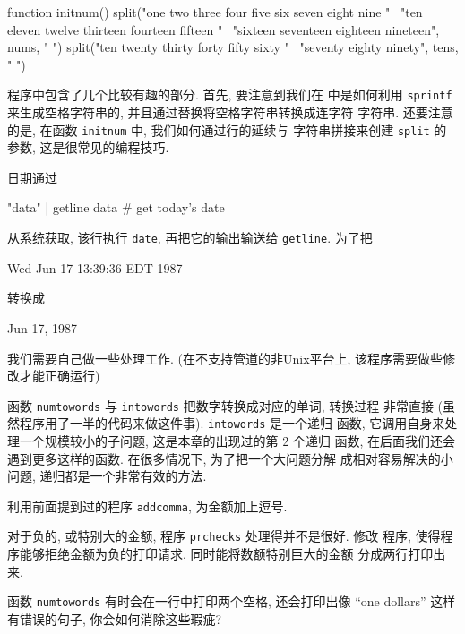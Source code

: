\begin{shell}
\begin{awkcode}
    function initnum() {
        split("one two three four five six seven eight nine " \
              "ten eleven twelve thirteen fourteen fifteen " \
              "sixteen seventeen eighteen nineteen", nums, " ")
        split("ten twenty thirty forty fifty sixty " \
              "seventy eighty ninety", tens, " ")
    }
\end{awkcode}

程序中包含了几个比较有趣的部分. 首先, 要注意到我们在 \BEGIN 中是如何利用
\verb'sprintf' 来生成空格字符串的, 并且通过替换将空格字符串转换成连字符
字符串. 还要注意的是, 在函数 \verb'initnum' 中, 我们如何通过行的延续与
字符串拼接来创建 \verb'split' 的参数, 这是很常见的编程技巧.

日期通过
\begin{awkcode}
    "data" | getline data   # get today's date
\end{awkcode}
从系统获取, 该行执行 \verb'date', 再把它的输出输送给 \verb'getline'. 为了把
\begin{shell}
    Wed Jun 17 13:39:36 EDT 1987
\end{shell}
转换成 
\begin{shell}
    Jun 17, 1987
\end{shell}
我们需要自己做一些处理工作.
(在不支持管道的非Unix平台上, 该程序需要做些修改才能正确运行)

函数 \verb'numtowords' 与 \verb'intowords' 把数字转换成对应的单词, 转换过程
非常直接 (虽然程序用了一半的代码来做这件事). \verb'intowords' 是一个递归
函数, 它调用自身来处理一个规模较小的子问题, 这是本章的出现过的第 2 个递归
函数, 在后面我们还会遇到更多这样的函数. 在很多情况下, 为了把一个大问题分解
成相对容易解决的小问题, 递归都是一个非常有效的方法.

\begin{exercise}
    利用前面提到过的程序 \verb'addcomma', 为金额加上逗号.
\end{exercise}

\begin{exercise}
    对于负的, 或特别大的金额, 程序 \verb'prchecks' 处理得并不是很好. 修改 
    程序, 使得程序能够拒绝金额为负的打印请求, 同时能将数额特别巨大的金额
    分成两行打印出来.
\end{exercise}

\begin{exercise}
    函数 \verb'numtowords' 有时会在一行中打印两个空格, 还会打印出像 
    ``one dollars'' 这样有错误的句子, 你会如何消除这些瑕疵?
\end{exercise}


\end{shell}

